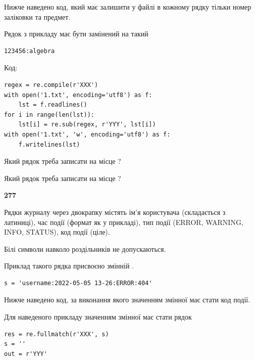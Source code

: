 Нижче наведено код, який має залишити у файлі в кожному рядку тільки номер заліковки та предмет.

Рядок з прикладу має бути замінений на такий



\begin{verbatim}
123456:algebra
\end{verbatim}




Код:



\begin{verbatim}
regex = re.compile(r'XXX')
with open('1.txt', encoding='utf8') as f:
    lst = f.readlines()
for i in range(len(lst)):
    lst[i] = re.sub(regex, r'YYY', lst[i])
with open('1.txt', 'w', encoding='utf8') as f:
    f.writelines(lst)
\end{verbatim}









Який рядок треба записати на місце  ?\par
\vspace{5mm}


Який рядок треба записати на місце  ?\par


\newpage

{\begin {center}\textbf{ 277}\end {center}}\par
Рядки журналу через двокрапку містять ім'я користувача (складається з латиниці), час події (фор\-мат як у прикладі), тип події (ERROR, WARNING, INFO, STATUS), код події (ціле).

Білі символи навколо роздільників не допускаються.

Приклад такого рядка присвоєно змінній .



\begin{verbatim}
s = 'username:2022-05-05 13-26:ERROR:404'
\end{verbatim}


Нижче наведено код, за виконання якого значенням змінної  має стати код події.

Для наведеного прикладу значенням змінної  має стати рядок 



\begin{verbatim}
res = re.fullmatch(r'XXX', s)
s = ''
out = r'YYY'
\end{verbatim}



